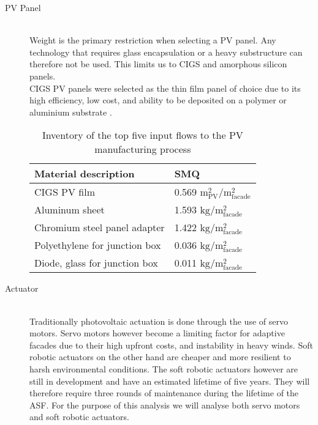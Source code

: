 \begin{description}

\item[PV Panel] \hfill\\
Weight is the primary restriction when selecting a PV panel. Any technology that requires glass encapsulation or a heavy substructure can therefore not be used. This limits us to CIGS and amorphous silicon panels.\\

CIGS PV panels were selected as the thin film panel of choice due to its high efficiency, low cost, and ability to be deposited on a polymer or aluminium substrate \cite{chirilua2011highly}. 




\begin{table}[H]
\centering
\begin{tabular}{ll}
\hline
Material description & SMQ \\ \hline
CIGS PV film       	 & 0.569 ${\mathrm{m^2_{PV}/m^2_{facade}}}$\\
Aluminum sheet 	 & 1.593 ${\mathrm{kg/m^2_{facade}}}$\\
Chromium steel panel adapter  & 1.422 ${\mathrm{kg/m^2_{facade}}}$\\
Polyethylene for junction box & 0.036 ${\mathrm{kg/m^2_{facade}}}$\\
Diode, glass for junction box & 0.011 ${\mathrm{kg/m^2_{facade}}}$\\
\hline
\end{tabular}
\caption{Inventory of the top five input flows to the PV manufacturing process}
\label{tab:PVinv}
\end{table}

\item[Actuator] \hfill \\
Traditionally photovoltaic actuation is done through the use of servo motors. Servo motors however become a limiting factor for adaptive facades due to their high upfront costs, and instability in heavy winds. Soft robotic actuators on the other hand are cheaper and more resilient to harsh environmental conditions\cite{Svetozarevic2014a}. The soft robotic actuators however are still in development and have an estimated lifetime of five years. They will therefore require three rounds of maintenance during the lifetime of the ASF.
For the purpose of this analysis we will analyse both servo motors and soft robotic actuators. 


\end{description}
